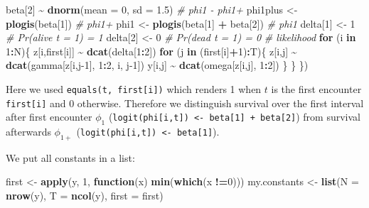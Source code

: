 \documentclass[
  12pt,
]{krantz}
\newenvironment{Shaded}{\begin{snugshade}}{\end{snugshade}}
\newcommand{\AttributeTok}[1]{\textcolor[rgb]{0.13,0.29,0.53}{#1}}
\newcommand{\CommentTok}[1]{\textcolor[rgb]{0.56,0.35,0.01}{\textit{#1}}}
\newcommand{\ControlFlowTok}[1]{\textcolor[rgb]{0.13,0.29,0.53}{\textbf{#1}}}
\newcommand{\DecValTok}[1]{\textcolor[rgb]{0.00,0.00,0.81}{#1}}
\newcommand{\FloatTok}[1]{\textcolor[rgb]{0.00,0.00,0.81}{#1}}
\newcommand{\FunctionTok}[1]{\textcolor[rgb]{0.13,0.29,0.53}{\textbf{#1}}}
\newcommand{\NormalTok}[1]{#1}
\newcommand{\OtherTok}[1]{\textcolor[rgb]{0.56,0.35,0.01}{#1}}
\newcommand{\SpecialCharTok}[1]{\textcolor[rgb]{0.81,0.36,0.00}{\textbf{#1}}}
\begin{document}
\begin{Shaded}
\begin{Highlighting}[]
\NormalTok{  beta[}\DecValTok{2}\NormalTok{] }\SpecialCharTok{\textasciitilde{}} \FunctionTok{dnorm}\NormalTok{(}\AttributeTok{mean =} \DecValTok{0}\NormalTok{, }\AttributeTok{sd =} \FloatTok{1.5}\NormalTok{) }\CommentTok{\# phi1 {-} phi1+}
\NormalTok{  phi1plus }\OtherTok{\textless{}{-}} \FunctionTok{plogis}\NormalTok{(beta[}\DecValTok{1}\NormalTok{])         }\CommentTok{\# phi1+}
\NormalTok{  phi1 }\OtherTok{\textless{}{-}} \FunctionTok{plogis}\NormalTok{(beta[}\DecValTok{1}\NormalTok{] }\SpecialCharTok{+}\NormalTok{ beta[}\DecValTok{2}\NormalTok{])   }\CommentTok{\# phi1}
\NormalTok{  delta[}\DecValTok{1}\NormalTok{] }\OtherTok{\textless{}{-}} \DecValTok{1}                       \CommentTok{\# Pr(alive t = 1) = 1}
\NormalTok{  delta[}\DecValTok{2}\NormalTok{] }\OtherTok{\textless{}{-}} \DecValTok{0}                       \CommentTok{\# Pr(dead t = 1) = 0}
  \CommentTok{\# likelihood}
  \ControlFlowTok{for}\NormalTok{ (i }\ControlFlowTok{in} \DecValTok{1}\SpecialCharTok{:}\NormalTok{N)\{}
\NormalTok{    z[i,first[i]] }\SpecialCharTok{\textasciitilde{}} \FunctionTok{dcat}\NormalTok{(delta[}\DecValTok{1}\SpecialCharTok{:}\DecValTok{2}\NormalTok{])}
    \ControlFlowTok{for}\NormalTok{ (j }\ControlFlowTok{in}\NormalTok{ (first[i]}\SpecialCharTok{+}\DecValTok{1}\NormalTok{)}\SpecialCharTok{:}\NormalTok{T)\{}
\NormalTok{      z[i,j] }\SpecialCharTok{\textasciitilde{}} \FunctionTok{dcat}\NormalTok{(gamma[z[i,j}\DecValTok{{-}1}\NormalTok{], }\DecValTok{1}\SpecialCharTok{:}\DecValTok{2}\NormalTok{, i, j}\DecValTok{{-}1}\NormalTok{])}
\NormalTok{      y[i,j] }\SpecialCharTok{\textasciitilde{}} \FunctionTok{dcat}\NormalTok{(omega[z[i,j], }\DecValTok{1}\SpecialCharTok{:}\DecValTok{2}\NormalTok{])}
\NormalTok{    \}}
\NormalTok{  \}}
\NormalTok{\})}
\end{Highlighting}
\end{Shaded}

Here we used \texttt{equals(t,\ first{[}i{]})} which renders 1 when \(t\) is the first encounter \texttt{first{[}i{]}} and 0 otherwise. Therefore we distinguish survival over the first interval after first encounter \(\phi_1\) (\texttt{logit(phi{[}i,t{]})\ \textless{}-\ beta{[}1{]}\ +\ beta{[}2{]}}) from survival afterwards \(\phi_{1+}\) (\texttt{logit(phi{[}i,t{]})\ \textless{}-\ beta{[}1{]}}).

We put all constants in a list:

\begin{Shaded}
\begin{Highlighting}[]
\NormalTok{first }\OtherTok{\textless{}{-}} \FunctionTok{apply}\NormalTok{(y, }\DecValTok{1}\NormalTok{, }\ControlFlowTok{function}\NormalTok{(x) }\FunctionTok{min}\NormalTok{(}\FunctionTok{which}\NormalTok{(x }\SpecialCharTok{!=}\DecValTok{0}\NormalTok{)))}
\NormalTok{my.constants }\OtherTok{\textless{}{-}} \FunctionTok{list}\NormalTok{(}\AttributeTok{N =} \FunctionTok{nrow}\NormalTok{(y), }
                     \AttributeTok{T =} \FunctionTok{ncol}\NormalTok{(y), }
                     \AttributeTok{first =}\NormalTok{ first)}
\end{Highlighting}
\end{Shaded}
\end{document}
